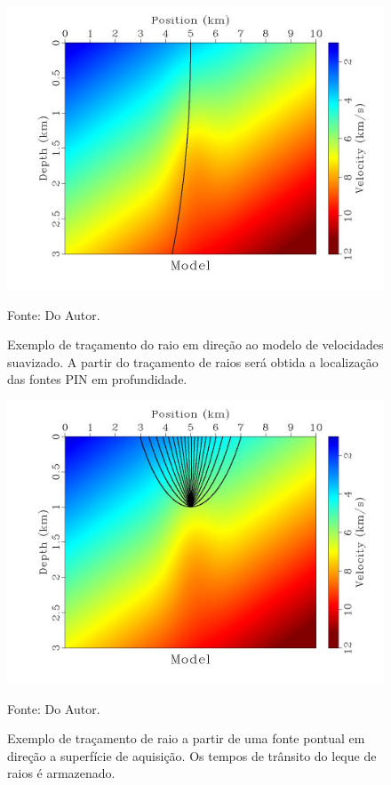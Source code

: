 \begin{figure}[H]
\caption{Exemplo de traçamento do raio em direção ao modelo de velocidades suavizado.
A partir do traçamento de raios será obtida a localização das fontes PIN em profundidade.}
\begin{center}
\includegraphics[scale=0.3]{images/raiomodelo.jpg}
\vspace{-0.3cm}
\end{center}
\begin{center}
 Fonte: Do Autor.
\end{center}
\label{fig:2.3}
\end{figure}

\begin{figure}[H]
\caption{Exemplo de traçamento de raio a partir de uma fonte pontual em direção a superfície de aquisição.
Os tempos de trânsito do leque de raios é armazenado.}
\begin{center}
\includegraphics[scale=0.3]{images/raioleque.jpg}
\vspace{-0.3cm}
\end{center}
\begin{center}
 Fonte: Do Autor.
\end{center}
\label{fig:2.4}
\end{figure}

